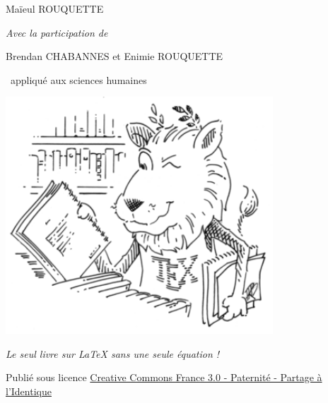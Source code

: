 \newpage\begin{center}
\parindent=0pt

{\Large Maïeul ROUQUETTE}
\vspace{0.5ex}

{\footnotesize \emph{Avec la participation de}}

\vspace{0.5ex}

{Brendan CHABANNES et Enimie ROUQUETTE}

\vspace{8ex}
{\LARGE\logo~appliqué aux sciences humaines}

\vspace{10ex}
\includegraphics[width=0.75\textwidth]{images/lion.png}
\vspace{3ex}

{\large \emph{Le seul livre sur LaTeX sans une seule équation !}}

\vspace{28ex}



{\small Publié sous licence \href{http://creativecommons.org/licenses/by-sa/3.0/fr/}{Creative Commons France 3.0 - Paternité - Partage à l'Identique}}
\end{center}
\newpage